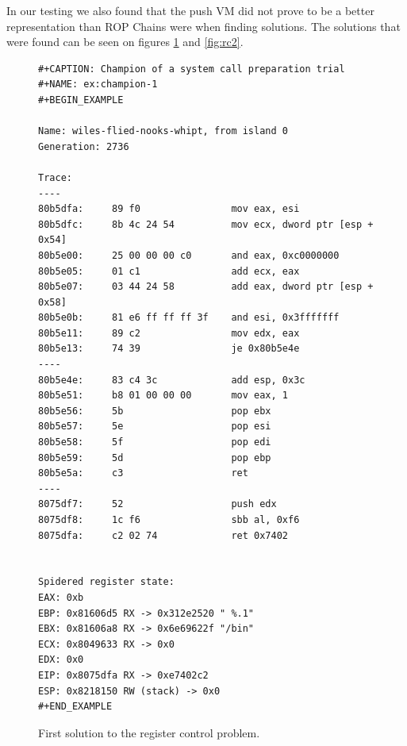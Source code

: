 \documentclass{article}
\begin{document}
In our testing we also found that the push VM did not prove to be a better representation than ROP Chains were when finding solutions. The solutions that were found can be seen on figures \ref{fig:rc1} and \ref{fig:rc2}.

\begin{figure}[ht]
\centering
\begin{verbatim}
#+CAPTION: Champion of a system call preparation trial
#+NAME: ex:champion-1
#+BEGIN_EXAMPLE

Name: wiles-flied-nooks-whipt, from island 0
Generation: 2736

Trace:
----
80b5dfa:	 89 f0                mov eax, esi
80b5dfc:	 8b 4c 24 54          mov ecx, dword ptr [esp + 0x54]
80b5e00:	 25 00 00 00 c0       and eax, 0xc0000000
80b5e05:	 01 c1                add ecx, eax
80b5e07:	 03 44 24 58          add eax, dword ptr [esp + 0x58]
80b5e0b:	 81 e6 ff ff ff 3f    and esi, 0x3fffffff
80b5e11:	 89 c2                mov edx, eax
80b5e13:	 74 39                je 0x80b5e4e
----
80b5e4e:	 83 c4 3c             add esp, 0x3c
80b5e51:	 b8 01 00 00 00       mov eax, 1
80b5e56:	 5b                   pop ebx
80b5e57:	 5e                   pop esi
80b5e58:	 5f                   pop edi
80b5e59:	 5d                   pop ebp
80b5e5a:	 c3                   ret 
----
8075df7:	 52                   push edx
8075df8:	 1c f6                sbb al, 0xf6
8075dfa:	 c2 02 74             ret 0x7402


Spidered register state:
EAX: 0xb
EBP: 0x81606d5 RX -> 0x312e2520 " %.1"
EBX: 0x81606a8 RX -> 0x6e69622f "/bin"
ECX: 0x8049633 RX -> 0x0
EDX: 0x0
EIP: 0x8075dfa RX -> 0xe7402c2
ESP: 0x8218150 RW (stack) -> 0x0
#+END_EXAMPLE
\end{verbatim}
\caption{First solution to the register control problem.}
\label{fig:rc1}
\end{figure}
\end{document}
